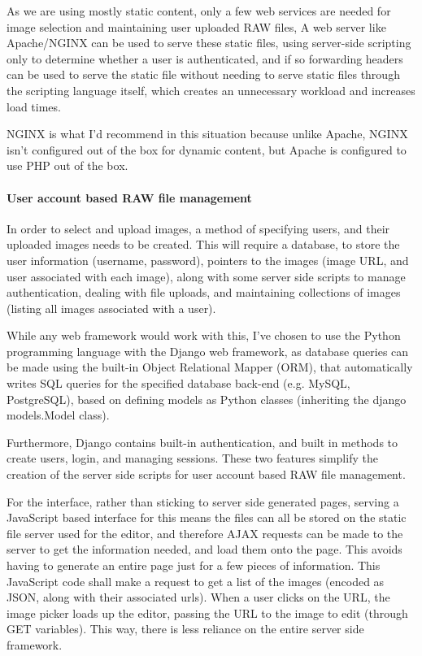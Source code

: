 \documentclass[12pt,a4paper]{article}
\begin{document}
As we are using mostly static content, only a few web services are needed for image selection and maintaining user uploaded RAW files, A web server like Apache/NGINX can be used to serve
these static files, using server-side scripting only to determine whether a user is authenticated,
and if so forwarding headers can be used to serve the static file without needing to serve static files
through the scripting language itself, which creates an unnecessary workload and increases load times.

NGINX is what I'd recommend in this situation because unlike Apache, NGINX isn't
configured out of the box for dynamic content, but Apache is configured to use PHP
out of the box.

\paragraph{User account based RAW file management}
In order to select and upload images, a method of specifying users, and their uploaded
images needs to be created. This will require a database, to store the user information (username,
password), pointers to the images (image URL, and user associated with each image), along with some
server side scripts to manage authentication, dealing with file uploads, and maintaining collections
of images (listing all images associated with a user).

While any web framework would work with this, I've chosen to use the Python programming
language with the Django web framework, as database queries can be made using the built-in
Object Relational Mapper (ORM), that automatically writes SQL queries for the specified
database back-end (e.g. MySQL, PostgreSQL), based on defining models as Python classes (inheriting
the django models.Model class).

Furthermore, Django contains built-in authentication, and built in methods to create users,
login, and managing sessions. These two features simplify the creation of the server side scripts
for user account based RAW file management.

For the interface, rather than sticking to server side generated pages, serving a JavaScript based
interface for this means the files can all be stored on the static file server used for the editor,
and therefore AJAX requests can be made to the server to get the information needed, and load them
onto the page. This avoids having to generate an entire page just for a few pieces of information. This
JavaScript code shall make a request to get a list of the images (encoded as JSON, along with their associated
urls). When a user clicks on the URL, the image picker loads up the editor, passing the URL to the image to edit (through
GET variables). This way, there is less reliance on the entire server side framework.
\end{document}
